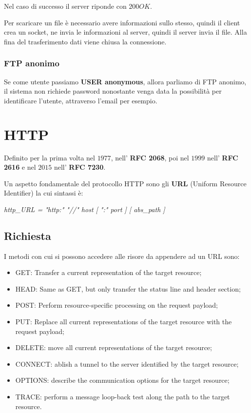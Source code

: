 Nel caso di successo il server riponde con $200OK$.


Per scaricare un file è necessario avere informazioni sullo stesso, quindi
il client crea un socket, ne invia le informazioni al server, quindi il
server invia il file.
Alla fina del trasferimento dati viene chiusa la connessione.

\subsection{FTP anonimo}
Se come utente passiamo \textbf{USER anonymous}, allora parliamo di FTP
anonimo, il sistema non richiede password nonostante venga data la
possibilità per identificare l'utente, attraverso l'email per esempio.

\chapter{HTTP}
Definito per la prima volta nel $1977$, nell' \textbf{RFC 2068}, poi nel $1999$
nell' \textbf{RFC 2616} e nel $2015$ nell' \textbf{RFC 7230}.

Un aspetto fondamentale del protocollo HTTP sono gli \textbf{URL} (Uniform
Resource Identifier) la cui sintassi è:

\emph{http\_URL = "http:" "//" host [ ":" port ] [ abs\_path ]}

\section{Richiesta}
I metodi con cui si possono accedere alle risore da appendere ad un URL sono:
\begin{itemize}
  \item GET: Transfer a current representation of the target resource;
  \item HEAD: Same as GET, but only transfer the status line and header
    section;
  \item POST: Perform resource-specific processing on the    request payload;
  \item PUT:  Replace all current representations of the target resource with
    the request payload;
  \item DELETE: move all current representations of the target resource;
  \item CONNECT: ablish a tunnel to the server identified by the target
    resource;
  \item OPTIONS: describe the communication options for the target resource;
  \item TRACE: perform a message loop-back test along the path to the target
    resource.
\end{itemize}

